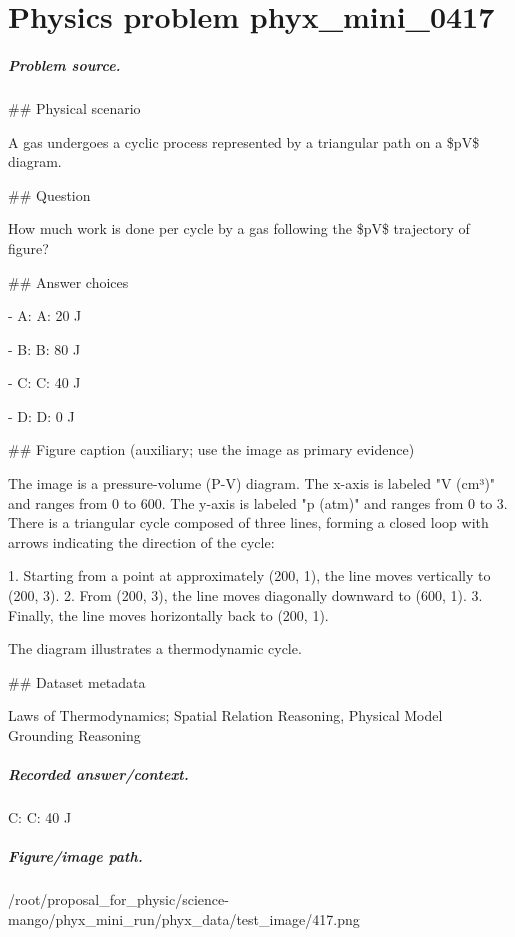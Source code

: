 
\chapter{Physics problem phyx\_mini\_0417}
\label{ch:PhyXMiniProblems_problem_phyx_mini_0417}

\paragraph{Problem source.}
\#\# Physical scenario

A gas undergoes a cyclic process represented by a triangular path on a \$pV\$ diagram.

\#\# Question

How much work is done per cycle by a gas following the \$pV\$ trajectory of figure?

\#\# Answer choices

- A: A: 20 J

- B: B: 80 J

- C: C: 40 J

- D: D: 0 J

\#\# Figure caption (auxiliary; use the image as primary evidence)

The image is a pressure-volume (P-V) diagram. The x-axis is labeled "V (cm³)" and ranges from 0 to 600. The y-axis is labeled "p (atm)" and ranges from 0 to 3. There is a triangular cycle composed of three lines, forming a closed loop with arrows indicating the direction of the cycle:

1. Starting from a point at approximately (200, 1), the line moves vertically to (200, 3).
2. From (200, 3), the line moves diagonally downward to (600, 1).
3. Finally, the line moves horizontally back to (200, 1).

The diagram illustrates a thermodynamic cycle.

\#\# Dataset metadata

Laws of Thermodynamics; Spatial Relation Reasoning, Physical Model Grounding Reasoning

\paragraph{Recorded answer/context.}
C: C: 40 J

\paragraph{Figure/image path.}
/root/proposal\_for\_physic/science-mango/phyx\_mini\_run/phyx\_data/test\_image/417.png

